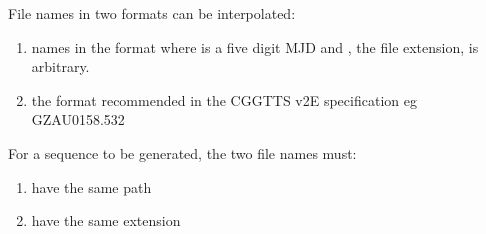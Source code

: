 File names in two formats can be interpolated:
\begin{enumerate}
\item names in the format  where  is a five digit MJD and , the file extension, is arbitrary.
\item the format recommended in the CGGTTS v2E specification eg GZAU0158.532 
\end{enumerate}

For a sequence to be generated, the two file names must:
\begin{enumerate}
\item have the same path
\item have the same extension
\end{enumerate}
